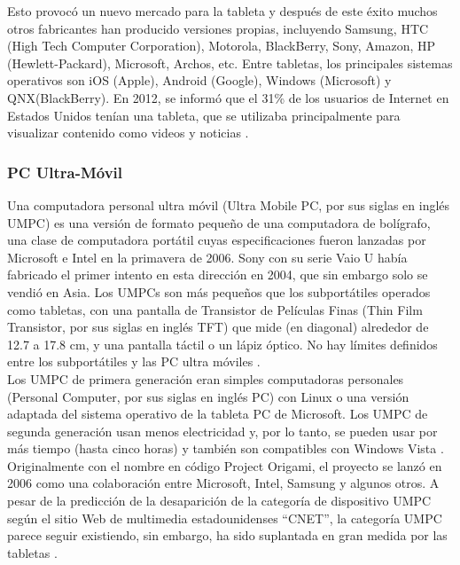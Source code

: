 Esto provocó un nuevo mercado para la tableta y después de este éxito muchos otros fabricantes han producido versiones propias, incluyendo Samsung, HTC (High Tech Computer Corporation), Motorola, BlackBerry, Sony, Amazon, HP (Hewlett-Packard), Microsoft, Archos, etc. Entre tabletas, los principales sistemas operativos son iOS (Apple), Android (Google), Windows (Microsoft) y QNX(BlackBerry). En 2012, se informó que el 31\% de los usuarios de Internet en Estados Unidos tenían una tableta, que se utilizaba principalmente para visualizar contenido como videos y noticias  \cite{MBPDA3}. \\

\subsubsection{PC Ultra-Móvil}

Una computadora personal ultra móvil (Ultra Mobile PC, por sus siglas en inglés UMPC) es una versión de formato pequeño de una computadora de bolígrafo, una clase de computadora portátil cuyas especificaciones fueron lanzadas por Microsoft e Intel en la primavera de 2006. Sony con su serie Vaio U había fabricado el primer intento en esta dirección en 2004, que sin embargo solo se vendió en Asia. Los UMPCs son más pequeños que los subportátiles operados como tabletas, con una pantalla de Transistor de Películas Finas (Thin Film Transistor, por sus siglas en inglés TFT) que mide (en diagonal) alrededor de 12.7 a 17.8 cm, y una pantalla táctil o un lápiz óptico. No hay límites definidos entre los subportátiles y las PC ultra móviles \cite{MBPCUM}. \\

Los UMPC de primera generación eran simples computadoras personales (Personal Computer, por sus siglas en inglés PC) con Linux o una versión adaptada del sistema operativo de la tableta PC de Microsoft. Los UMPC de segunda generación usan menos electricidad y, por lo tanto, se pueden usar por más tiempo (hasta cinco horas) y también son compatibles con Windows Vista \cite{MBPCUM}. \\

Originalmente con el nombre en código Project Origami, el proyecto se lanzó en 2006 como una colaboración entre Microsoft, Intel, Samsung y algunos otros. A pesar de la predicción de la desaparición de la categoría de dispositivo UMPC según el sitio Web de multimedia estadounidenses ``CNET'', la categoría UMPC parece seguir existiendo, sin embargo, ha sido suplantada en gran medida por las tabletas \cite{MBPDO}. \\

